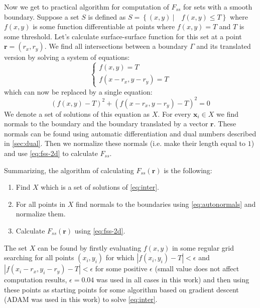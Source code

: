 \documentclass[preprint]{elsarticle}
\begin{document}
Now we get to practical algorithm for computation of $F_{ss}$ for sets with a
smooth boundary. Suppose a set $S$ is defined as
$S = \left\{ (x, y) \ | \quad f(x, y) \le T \right\}$ where $f(x, y)$ is some
function differentiable at points where $f(x, y) = T$ and $T$ is some
threshold. Let's calculate surface-surface function for this set at a point
$\bm{r} = (r_x, r_y)$. We find all intersections between a boundary $\Gamma$ and
its translated version by solving a system of equations:
\begin{equation}
  \left\{
  \begin{array}{l}
    f(x, y) = T \\
    f(x-r_x, y-r_y) = T
  \end{array}
  \right.
\end{equation}
which can now be replaced by a single equation:
\begin{equation}
  (f(x, y) - T)^2 + (f(x-r_x, y-r_y) - T)^2 = 0 \label{eq:inter}
\end{equation}
We denote a set of solutions of this equation as $X$. For every $\bm{x}_i \in X$
we find normals to the boundary and the boundary translated by a vector
$\bm{r}$. These normals can be found using automatic differentiation and dual
numbers described in \cref{sec:dual}. Then we normalize these normals (i.e. make
their length equal to $1$) and use \cref{eq:fss-2d} to calculate $F_{ss}$.

Summarizing, the algorithm of calculating $F_{ss}(\bm{r})$ is the following:
\begin{enumerate}
\item Find $X$ which is a set of solutions of \cref{eq:inter}.
\item For all points in $X$ find normals to the boundaries using
  \cref{eq:autonormals} and normalize them.
\item Calculate $F_{ss}(\bm{r})$ using \cref{eq:fss-2d}.
\end{enumerate}

The set $X$ can be found by firstly evaluating $f(x, y)$ in some regular grid
searching for all points $(x_i, y_i)$ for which $|f(x_i, y_i) - T| < \epsilon$
and $|f(x_i - r_x, y_i - r_y) - T| < \epsilon$ for some positive $\epsilon$ 
(small value does not affect computation results, $\epsilon=0.04$ was used in
all cases in this work) and then using these points as starting points for some
algorithm based on gradient descent (ADAM \cite{adam} was used in this work) to
solve \cref{eq:inter}.
\end{document}
